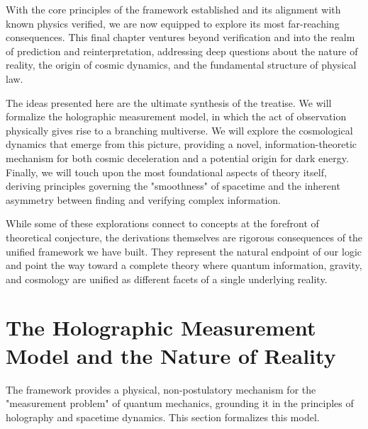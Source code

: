 \documentclass[11pt, letterpaper]{report}
\theoremstyle{plain} %
\theoremstyle{definition} %
\theoremstyle{remark} %
\begin{document}
With the core principles of the framework established and its alignment with known physics verified, we are now equipped to explore its most far-reaching consequences. This final chapter ventures beyond verification and into the realm of prediction and reinterpretation, addressing deep questions about the nature of reality, the origin of cosmic dynamics, and the fundamental structure of physical law.

The ideas presented here are the ultimate synthesis of the treatise. We will formalize the holographic measurement model, in which the act of observation physically gives rise to a branching multiverse. We will explore the cosmological dynamics that emerge from this picture, providing a novel, information-theoretic mechanism for both cosmic deceleration and a potential origin for dark energy. Finally, we will touch upon the most foundational aspects of theory itself, deriving principles governing the "smoothness" of spacetime and the inherent asymmetry between finding and verifying complex information.

While some of these explorations connect to concepts at the forefront of theoretical conjecture, the derivations themselves are rigorous consequences of the unified framework we have built. They represent the natural endpoint of our logic and point the way toward a complete theory where quantum information, gravity, and cosmology are unified as different facets of a single underlying reality.

\section{The Holographic Measurement Model and the Nature of Reality}
\label{sec:explore_measurement}

The framework provides a physical, non-postulatory mechanism for the "measurement problem" of quantum mechanics, grounding it in the principles of holography and spacetime dynamics. This section formalizes this model.
\end{document}
